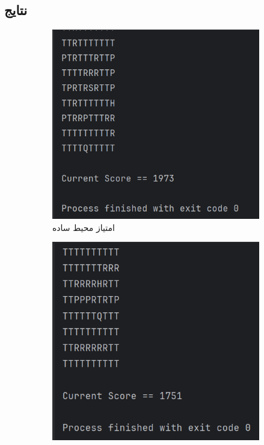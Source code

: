 \documentclass[11pt, a4paper, oneside]{article}
\begin{document}
\subsection{نتایج}
	  \begin{figure}[H]
	  	\centering
	  	\begin{subfigure}{0.24\textwidth}
	  		\includegraphics[width=\textwidth]{./images/score_simple}
	  		\caption{امتیاز محیط ساده}
	  		\label{fig:e}
	  	\end{subfigure}
	  	\hspace{0.5em}
	  	\begin{subfigure}{0.24\textwidth}
	  		\includegraphics[width=\textwidth]{./images/score_hard}

\end{subfigure}
\end{figure}
\end{document}
